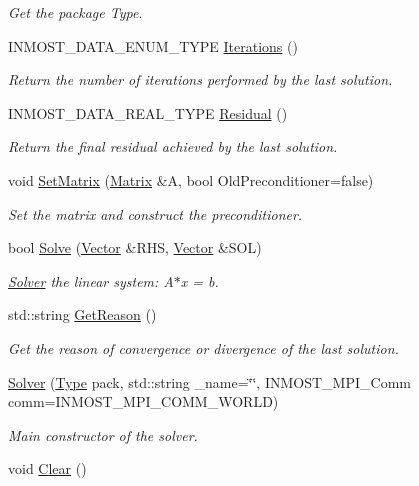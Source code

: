 \begin{DoxyCompactItemize}
\begin{DoxyCompactList}\small\item\em Get the package Type. \end{DoxyCompactList}\item 
I\-N\-M\-O\-S\-T\-\_\-\-D\-A\-T\-A\-\_\-\-E\-N\-U\-M\-\_\-\-T\-Y\-P\-E \hyperlink{classINMOST_1_1Solver_ad943889a4b31789185eee09af14a5d45}{Iterations} ()
\begin{DoxyCompactList}\small\item\em Return the number of iterations performed by the last solution. \end{DoxyCompactList}\item 
I\-N\-M\-O\-S\-T\-\_\-\-D\-A\-T\-A\-\_\-\-R\-E\-A\-L\-\_\-\-T\-Y\-P\-E \hyperlink{classINMOST_1_1Solver_ad10f8b22ba2d3c4ecbb4c22abfc62266}{Residual} ()
\begin{DoxyCompactList}\small\item\em Return the final residual achieved by the last solution. \end{DoxyCompactList}\item 
void \hyperlink{classINMOST_1_1Solver_a8e70ae0ef4eaa220d1db45089b4df1ff}{Set\-Matrix} (\hyperlink{classINMOST_1_1Solver_1_1Matrix}{Matrix} \&A, bool Old\-Preconditioner=false)
\begin{DoxyCompactList}\small\item\em Set the matrix and construct the preconditioner. \end{DoxyCompactList}\item 
bool \hyperlink{classINMOST_1_1Solver_ab31891d2c65c0ac93c06b91222b5cbfd}{Solve} (\hyperlink{classINMOST_1_1Solver_1_1Vector}{Vector} \&R\-H\-S, \hyperlink{classINMOST_1_1Solver_1_1Vector}{Vector} \&S\-O\-L)
\begin{DoxyCompactList}\small\item\em \hyperlink{classINMOST_1_1Solver}{Solver} the linear system\-: A$\ast$x = b. \end{DoxyCompactList}\item 
std\-::string \hyperlink{classINMOST_1_1Solver_afc0502769ba027228e7bda966498ebb5}{Get\-Reason} ()
\begin{DoxyCompactList}\small\item\em Get the reason of convergence or divergence of the last solution. \end{DoxyCompactList}\item 
\hyperlink{classINMOST_1_1Solver_a5951d4dcc90693cb8d02de403a382c69}{Solver} (\hyperlink{classINMOST_1_1Solver_ad21ba852fdfe10116b40aac266c0309b}{Type} pack, std\-::string \-\_\-name=\char`\"{}\char`\"{}, I\-N\-M\-O\-S\-T\-\_\-\-M\-P\-I\-\_\-\-Comm comm=I\-N\-M\-O\-S\-T\-\_\-\-M\-P\-I\-\_\-\-C\-O\-M\-M\-\_\-\-W\-O\-R\-L\-D)
\begin{DoxyCompactList}\small\item\em Main constructor of the solver. \end{DoxyCompactList}\item 
\hypertarget{classINMOST_1_1Solver_a5650d814c472b39bc82861b16f6e7075}{void \hyperlink{classINMOST_1_1Solver_a5650d814c472b39bc82861b16f6e7075}{Clear} ()}\label{classINMOST_1_1Solver_a5650d814c472b39bc82861b16f6e7075}


\end{DoxyCompactItemize}
